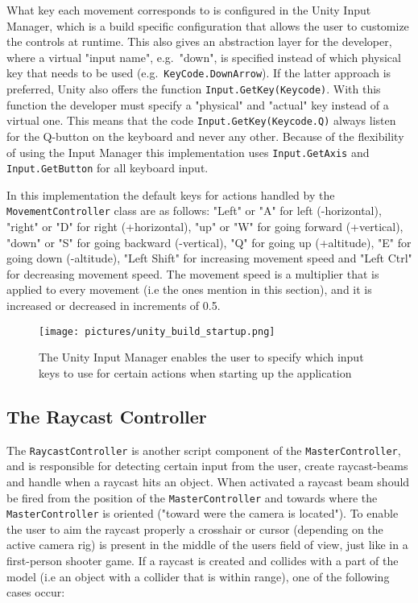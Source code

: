 What key each movement corresponds to is configured in the Unity Input Manager, which is a build specific configuration that allows the user to customize the 
controls at runtime. This also gives an abstraction layer for the developer, where a virtual "input name", e.g.~"down", is specified instead of which physical key that needs to be 
used (e.g.~\texttt{KeyCode.DownArrow}). If the latter approach is preferred, Unity also offers the function \texttt{Input.GetKey(Keycode)}. 
With this function the developer must specify a "physical" and "actual" key instead of a virtual one. 
This means that the code \texttt{Input.GetKey(Keycode.Q)} always listen for the Q-button on the keyboard and never any other. 
Because of the flexibility of using the Input Manager this implementation uses \texttt{Input.GetAxis} and \texttt{Input.GetButton} for all keyboard input.

In this implementation the default keys for actions handled by the \texttt{MovementController} class are as follows:
"Left" or "A" for left (-horizontal), "right" or "D" for right (+horizontal), "up" or "W" for going forward (+vertical), 
"down" or "S" for going backward (-vertical), "Q" for going up (+altitude), "E" for going down (-altitude), "Left Shift" for increasing movement speed and
"Left Ctrl" for decreasing movement speed. The movement speed is a multiplier that is applied to every movement (i.e the ones mention in this section),
and it is increased or decreased in increments of 0.5.  

\begin{figure}
\label{fig:unity_build_startup}
\texttt{[image: pictures/unity\_build\_startup.png]}
\caption[The Unity Input Manager enable startup configuration]{The Unity Input Manager enables the user to specify which input keys to use for certain actions
when starting up the application}
\end{figure}


\subsection{The Raycast Controller}
The \texttt{RaycastController} is another script component of the \texttt{MasterController}, and is responsible for detecting certain input from the user, create raycast-beams 
and handle when a raycast hits an object. When activated a raycast beam should be fired from the position of the \texttt{MasterController} and towards where the 
\texttt{MasterController} is oriented ("toward were the camera is located"). To enable the user to aim the raycast properly a crosshair or cursor (depending on the 
active camera rig) is present in the middle of the users field of view, just like in a first-person shooter game. 
If a raycast is created and collides with a part of the model (i.e an object with a collider that is within range), one of the following cases occur:

